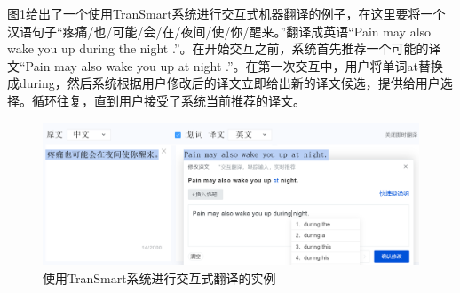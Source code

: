 \parinterval 图\ref{fig:18-2}给出了一个使用TranSmart系统进行交互式机器翻译的例子，在这里要将一个汉语句子“疼痛/也/可能/会/在/夜间/使/你/醒来。”翻译成英语“Pain may also wake you up during the night .”。在开始交互之前，系统首先推荐一个可能的译文“Pain may also wake you up at night .”。在第一次交互中，用户将单词at替换成during，然后系统根据用户修改后的译文立即给出新的译文候选，提供给用户选择。循环往复，直到用户接受了系统当前推荐的译文。

\begin{figure}[htp]
\centering
\includegraphics[scale=0.4]{./Chapter18/Figures/figure-transSmart.png}
\caption{使用TranSmart系统进行交互式翻译的实例}
\label{fig:18-2}
\end{figure}

